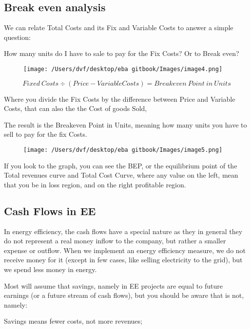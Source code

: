 \documentclass[]{book}
\theoremstyle{definition}
\theoremstyle{definition}
\theoremstyle{definition}
\theoremstyle{remark}
\begin{document}
\subsection{Break even analysis}\label{break-even-analysis}

We can relate Total Costs and its Fix and Variable Costs to answer a
simple question:

How many units do I have to sale to pay for the Fix Costs? Or to Break
even?

\begin{figure}[htbp]
\centering
\texttt{[image: /Users/dvf/desktop/eba gitbook/Images/image4.png]}
\caption{}
\end{figure}

\[Fixed \ Costs ÷ (Price - Variable Costs) = Breakeven\ Point\ in \ Units\]

Where you divide the Fix Costs by the difference between Price and
Variable Costs, that can also the the Cost of goods Sold,

The result is the Breakeven Point in Units, meaning how many units you
have to sell to pay for the fix Costs.

\begin{figure}[htbp]
\centering
\texttt{[image: /Users/dvf/desktop/eba gitbook/Images/image5.png]}
\caption{}
\end{figure}

If you look to the graph, you can see the BEP, or the equilibrium point
of the Total revenues curve and Total Cost Curve, where any value on the
left, mean that you be in loss region, and on the right profitable
region.

\subsection{Cash Flows in EE}\label{cash-flows-in-ee}

In energy efficiency, the cash flows have a special nature as they in
general they do not represent a real money inflow to the company, but
rather a smaller expense or outflow. When we implement an energy
efficiency measure, we do not receive money for it (except in few cases,
like selling electricity to the grid), but we spend less money in
energy.

Most will assume that savings, namely in EE projects are equal to future
earnings (or a future stream of cash flows), but you should be aware
that is not, namely:

Savings means fewer costs, not more revenues;
\end{document}
